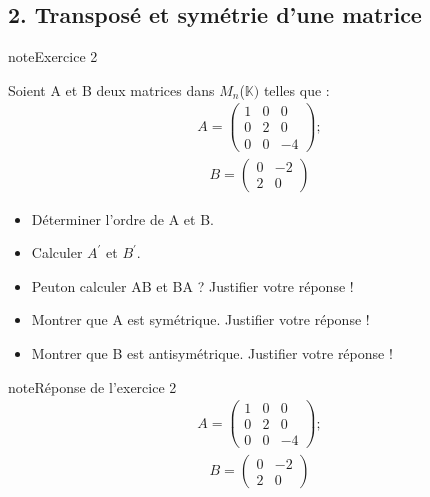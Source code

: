 \documentclass[letterpaper,10pt,french]{jupyterBook}
\begin{document}
\subsection{2. Transposé et symétrie d’une matrice}
\label{\detokenize{S_xe9rie3:transpose-et-symetrie-d-une-matrice}}
\begin{sphinxadmonition}{note}{Exercice 2}

\sphinxAtStartPar
Soient A et B deux matrices dans \(M_n\)(\(\mathbb{K})\) telles que :
\begin{equation*}
\begin{split}
A = 
\begin{pmatrix}
1 & 0 & 0 \\
0 & 2 & 0 \\
0 & 0 & -4 
\end{pmatrix} ; 
\end{split}
\end{equation*}\begin{equation*}
\begin{split}
B = 
\begin{pmatrix}
0 & -2  \\
2 & 0 
\end{pmatrix}
\end{split}
\end{equation*}\begin{itemize}
\item {} 
\sphinxAtStartPar
Déterminer l’ordre de A et B.

\item {} 
\sphinxAtStartPar
Calculer \(A^{'}\) et \(B^{'}\).

\item {} 
\sphinxAtStartPar
Peut\sphinxhyphen{}on calculer AB  et BA ? Justifier votre réponse !

\item {} 
\sphinxAtStartPar
Montrer que A est symétrique. Justifier votre réponse !

\item {} 
\sphinxAtStartPar
Montrer que B est antisymétrique. Justifier votre réponse !

\end{itemize}
\end{sphinxadmonition}

\begin{sphinxadmonition}{note}{Réponse de l’exercice 2}
\begin{equation*}
\begin{split}
A = 
\begin{pmatrix}
1 & 0 & 0 \\
0 & 2 & 0 \\
0 & 0 & -4 
\end{pmatrix} ; 
\end{split}
\end{equation*}\begin{equation*}
\begin{split}
B = 
\begin{pmatrix}
0 & -2  \\
2 & 0 
\end{pmatrix}
\end{split}
\end{equation*}\end{sphinxadmonition}
\end{document}
